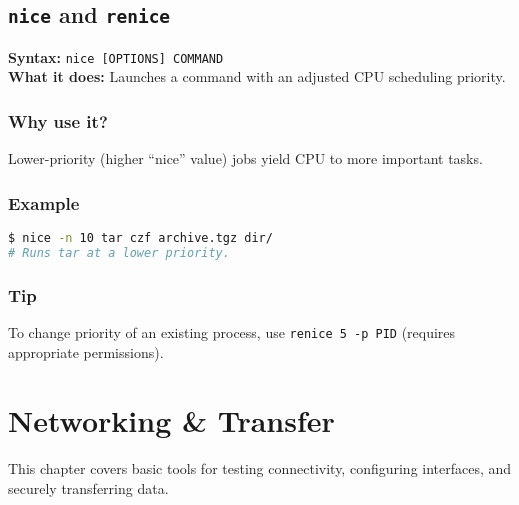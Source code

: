 \documentclass[10pt,oneside]{scrbook}
\begin{document}
\section{\texttt{nice} and \texttt{renice}}
\begin{cmdbox}
  \textbf{Syntax:} \lstinline!nice [OPTIONS] COMMAND! \\
  \textbf{What it does:} Launches a command with an adjusted CPU scheduling priority.
\end{cmdbox}
\begin{commanddetails}
  \subsection*{Why use it?}
    Lower-priority (higher “nice” value) jobs yield CPU to more important tasks.

  \subsection*{Example}
  \begin{lstlisting}[language=bash]
$ nice -n 10 tar czf archive.tgz dir/
# Runs tar at a lower priority.
  \end{lstlisting}

  \subsection*{Tip}
    To change priority of an existing process, use \lstinline!renice 5 -p PID! (requires appropriate permissions).
\end{commanddetails}

\chapter{Networking \& Transfer}

This chapter covers basic tools for testing connectivity, configuring interfaces, and securely transferring data.

\end{document}
